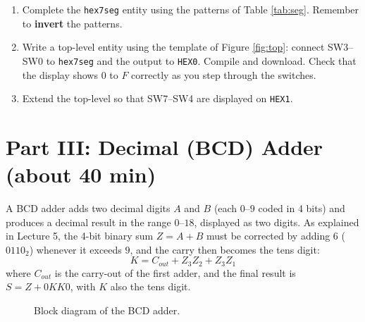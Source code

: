 \documentclass{article}
\begin{document}
\begin{enumerate}
    \item Complete the \texttt{hex7seg} entity using the patterns of Table \ref{tab:seg}. Remember to \textbf{invert} the patterns.
    \item Write a top-level entity using the template of Figure \ref{fig:top}: connect SW3--SW0 to \texttt{hex7seg} and the output to \texttt{HEX0}. Compile and download. Check that the display shows $0$ to $F$ correctly as you step through the switches.
    \item Extend the top-level so that SW7--SW4 are displayed on \texttt{HEX1}.
\end{enumerate}

\section*{Part III: Decimal (BCD) Adder (about 40 min)}

A BCD adder adds two decimal digits $A$ and $B$ (each $0$--$9$ coded in 4 bits) and produces a decimal result in the range $0$--$18$, displayed as two digits. As explained in Lecture 5, the 4-bit binary sum $Z = A + B$ must be corrected by adding $6$ ($0110_2$) whenever it exceeds $9$, and the carry then becomes the tens digit:
\[ K = C_{out} + Z_3 Z_2 + Z_3 Z_1 \]
where $C_{out}$ is the carry-out of the first adder, and the final result is $S = Z + 0KK0$, with $K$ also the tens digit.

\begin{figure}[H]
    \centering
    \caption{Block diagram of the BCD adder.}
    \label{fig:bcd}
\end{figure}
\end{document}
